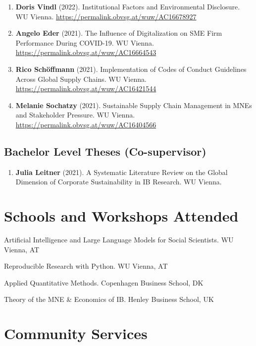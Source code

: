 \documentclass[11pt,a4paper]{article}
\begin{document}
\begin{cv}
\begin{enumerate}
    \item \textbf{Doris Vindl} (2022). Institutional Factors and Environmental Disclosure. WU Vienna. \url{https://permalink.obvsg.at/wuw/AC16678927}
    
    \item \textbf{Angelo Eder} (2021). The Influence of Digitalization on SME Firm Performance During COVID-19. WU Vienna. \url{https://permalink.obvsg.at/wuw/AC16664543}
    
    \item \textbf{Rico Schöffmann} (2021). Implementation of Codes of Conduct Guidelines Across Global Supply Chains. WU Vienna. \url{https://permalink.obvsg.at/wuw/AC16421544}
    
    \item \textbf{Melanie Sochatzy} (2021). Sustainable Supply Chain Management in MNEs and Stakeholder Pressure. WU Vienna. \url{https://permalink.obvsg.at/wuw/AC16404566}
\end{enumerate}

\subsection{Bachelor Level Theses (Co-supervisor)}

\begin{enumerate}
    \item \textbf{Julia Leitner} (2021). A Systematic Literature Review on the Global Dimension of Corporate Sustainability in IB Research. WU Vienna.
\end{enumerate}

\section{Schools and Workshops Attended}
\begin{cvlist}{}
    \item[Feb 2026] Artificial Intelligence and Large Language Models for Social Scientists. WU Vienna, AT
    \item[Jan 2026] Reproducible Research with Python. WU Vienna, AT
    \item[Mar 2022] Applied Quantitative Methods. Copenhagen Business School, DK
    \item[Nov 2020] Theory of the MNE \& Economics of IB. Henley Business School, UK
\end{cvlist}

\section{Community Services}

\end{cv}
\end{document}
